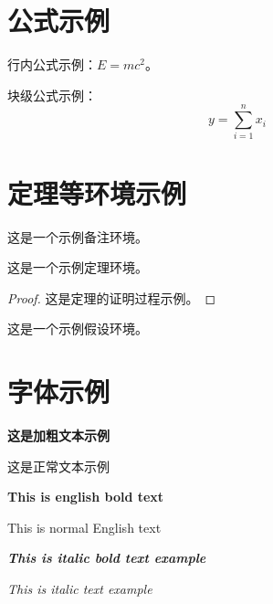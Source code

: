 \section{公式示例}
行内公式示例：$E=mc^2$。

块级公式示例：
\begin{equation}
  y = \sum_{i=1}^{n} x_i
  \label{eq:template}
\end{equation}

\section{定理等环境示例}
\begin{remark}
  这是一个示例备注环境。
\end{remark}

\begin{theorem}
  这是一个示例定理环境。
\end{theorem}
\begin{proof}
  这是定理的证明过程示例。
\end{proof}

\begin{assumption}
  这是一个示例假设环境。
\end{assumption}

\section{字体示例}

\textbf{这是加粗文本示例}

这是正常文本示例

\textbf{This is english bold text}

This is normal English text

\textit{\textbf{This is italic bold text example}}

\textit{This is italic text example}
